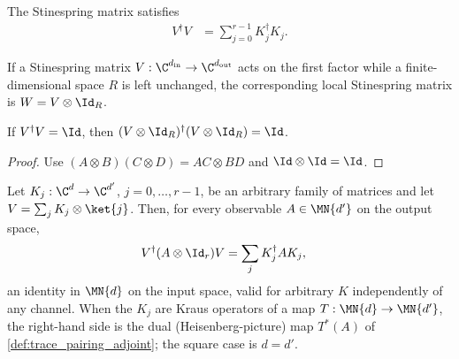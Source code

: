 \begin{theorem}\label{thm:stinespring_v_conjTranspose_mul}
    \leanok
    The Stinespring matrix satisfies
    \begin{align}
        V^\dagger V
        &=\sum_{j=0}^{r-1}K_j^\dagger K_j.
        \label{eq:representations_stinespring_gram}
    \end{align}
\end{theorem}

\begin{definition}\label{def:local_stinespring_v}
    \leanok
    If a Stinespring matrix $V:\C^{d_{\mathrm{in}}}\to
    \C^{d_{\mathrm{out}}}$ acts on the first factor while a finite-dimensional
    space $R$ is left unchanged, the corresponding local Stinespring matrix is
    $W=V\otimes\Id_R$.
\end{definition}

\begin{theorem}
    \label{thm:local_stinespring_v_conjTranspose_mul}
    \leanok
    If $V^\dagger V=\Id$, then
    $(V\otimes\Id_R)^\dagger(V\otimes\Id_R)=\Id$.
\end{theorem}

\begin{proof}\leanok
    Use $(A\otimes B)(C\otimes D)=AC\otimes BD$ and
    $\Id\otimes\Id=\Id$.
\end{proof}

\begin{theorem}\label{thm:stinespring_dual_representation}
    \leanok
    Let $K_j:\C^{d}\to\C^{d'}$, $j=0,\dots,r-1$, be an arbitrary family of
    matrices and let $V=\sum_j K_j\otimes\ket{j}$. Then, for every observable
    $A\in\MN{d'}$ on the output space,
    \begin{align}
        V^\dagger(A\otimes\Id_r)V
        &=\sum_j K_j^\dagger A K_j,
        \label{eq:representations_stinespring_dual}
    \end{align}
    an identity in $\MN{d}$ on the input space, valid for arbitrary $K$
    independently of any channel. When the $K_j$ are Kraus operators of a map
    $T:\MN{d}\to\MN{d'}$, the right-hand side is the dual
    (Heisenberg-picture) map $T^*(A)$ of \ref{def:trace_pairing_adjoint}; the
    square case is $d=d'$.
\end{theorem}

